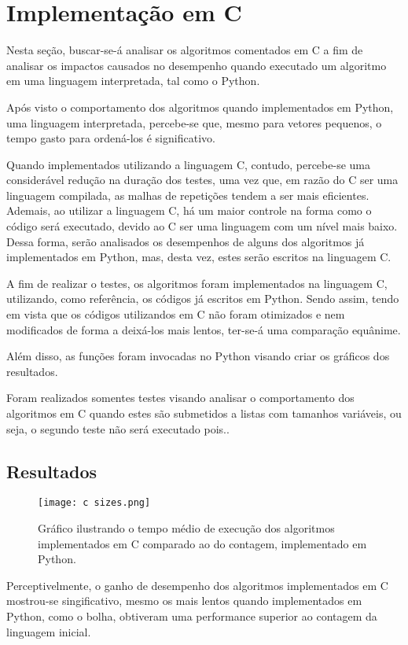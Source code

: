 \section{Implementação em C}
Nesta seção, buscar-se-á analisar os algoritmos comentados em C a fim de analisar os impactos causados no desempenho quando executado um algoritmo em uma linguagem interpretada, tal como o Python.

Após visto o comportamento dos algoritmos quando implementados em Python, uma linguagem interpretada, percebe-se que, mesmo para vetores pequenos, o tempo gasto para ordená-los é significativo.

Quando implementados utilizando a linguagem C, contudo, percebe-se uma considerável redução na duração dos testes, uma vez que, em razão do C ser uma linguagem compilada, as malhas de repetições tendem a ser mais eficientes.
Ademais, ao utilizar a linguagem C, há um maior controle na forma como o código será executado, devido ao C ser uma linguagem com um nível mais baixo.
Dessa forma, serão analisados os desempenhos de alguns dos algoritmos já implementados em Python, mas, desta vez, estes serão escritos na linguagem C.

A fim de realizar o testes, os algoritmos foram implementados na linguagem C, utilizando, como referência, os códigos já escritos em Python. Sendo assim, tendo em vista que os códigos utilizandos em C não foram otimizados e nem modificados de forma a deixá-los mais lentos, ter-se-á uma comparação equânime.

Além disso, as funções foram invocadas no Python visando criar os gráficos dos resultados.

Foram realizados somentes testes visando analisar o comportamento dos algoritmos em C quando estes são submetidos a listas com tamanhos variáveis, ou seja, o segundo teste não será executado pois..
\newpage
\subsection{Resultados}
\begin{figure}[h]
    \texttt{[image: c sizes.png]}
    \caption{Gráfico ilustrando o tempo médio de execução dos algoritmos implementados em C comparado ao do contagem, implementado em Python.}
\end{figure}
Perceptivelmente, o ganho de desempenho dos algoritmos implementados em C mostrou-se singificativo, mesmo os mais lentos quando implementados em Python, como o bolha, obtiveram uma performance superior ao contagem da linguagem inicial.

